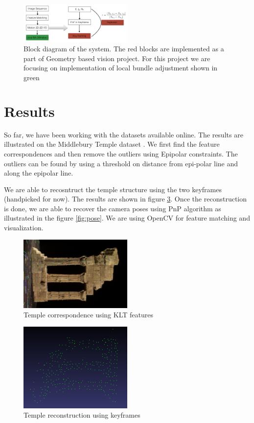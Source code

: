 \documentclass[12pt,twocolumn,letterpaper]{article}
\begin{document}
\begin{figure}
\includegraphics[width=0.5\textwidth]{images/block}
\caption{Block diagram of the system. The red blocks are implemented as a part of Geometry based vision project. For this project we are focusing on implementation of local bundle adjustment shown in green}
\label{fig:block}
\end{figure}


\section{Results}
So far, we have been working with the datasets available online. The results are illustrated on the Middlebury Temple dataset \cite{middlebury}. We first find the feature correspondences and then remove the outliers using Epipolar constraints. The outliers can be found by using a threshold on distance from epi-polar line and along the epipolar line.

We are able to recosntruct the temple structure using the two keyframes (handpicked for now). The results are shown in figure \ref{fig:reconstruction}. Once the reconstruction is done, we are able to recover the camera poses using PnP algorithm as illustrated in the figure \ref{fig:pose}. We are using OpenCV for feature matching and visualization.


\begin{figure}
\includegraphics[width=0.5\textwidth]{images/temple_correspondence}
\caption{Temple correspondence using KLT features}
\label{fig:correspondence}
\end{figure}

\begin{figure}
\includegraphics[width=0.5\textwidth]{images/temple1}
\caption{Temple reconstruction using keyframes}
\label{fig:reconstruction}
\end{figure}
\end{document}

